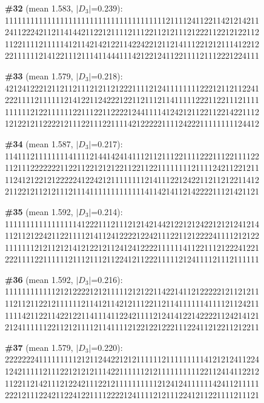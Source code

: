 \documentclass[10pt]{article}
\begin{document}
\noindent\textbf{\#32} (mean 1.583, $|D_3|$=0.239):\\
111111111111111111111111111111111111112111124112211421214211\\
241122242112114144211221211112111221121211121222112212122112\\
112211112111114121142142122114224221211214111221212111412212\\
221111112141221112111411444111421221241122111121112221224111\medskip

\noindent\textbf{\#33} (mean 1.579, $|D_3|$=0.218):\\
421241222121121121112121121222111121241111111122212112112241\\
222111121111112141221124222122112111211411111222112211121111\\
111111212211111122111221122221244111141242121122112214221112\\
121221211222212111221112211114212222211112422211111111124412\medskip

\noindent\textbf{\#34} (mean 1.587, $|D_3|$=0.217):\\
114111211111111411112144142414111211211122111122211122111122\\
112111222222211221122121212211221122111111112111124211221211\\
112412122121222224122421211111111214111221242211211212211412\\
211221211212111211141111111111111411421411214222211121421121\medskip

\noindent\textbf{\#35} (mean 1.592, $|D_3|$=0.214):\\
111111111111111114122211121112121421442122121242212121241214\\
112112122421122111121411241222212242111221121222241111212122\\
111111121211212141212212112412412222111111411221112122241221\\
222111122111111211121112112241211222111112124111121112111111\medskip

\noindent\textbf{\#36} (mean 1.592, $|D_3|$=0.216):\\
111111111111212122221212111112121221142214112122222121121211\\
112112112212111111211412114212111221121141111114111121124211\\
111142112211422122114111411224211112124141221422221124214121\\
212411111122112121111211411112122122122211122411212211212211\medskip

\noindent\textbf{\#37} (mean 1.579, $|D_3|$=0.220):\\
222222241111111112121124422121211111121111111114121212411224\\
124211111211122121212111422111111212111111111122112414112212\\
112211214211121224211122121111111111212412411111142411211111\\
222121112242112241221111222212411112121112241211221111211121\medskip
\end{document}
